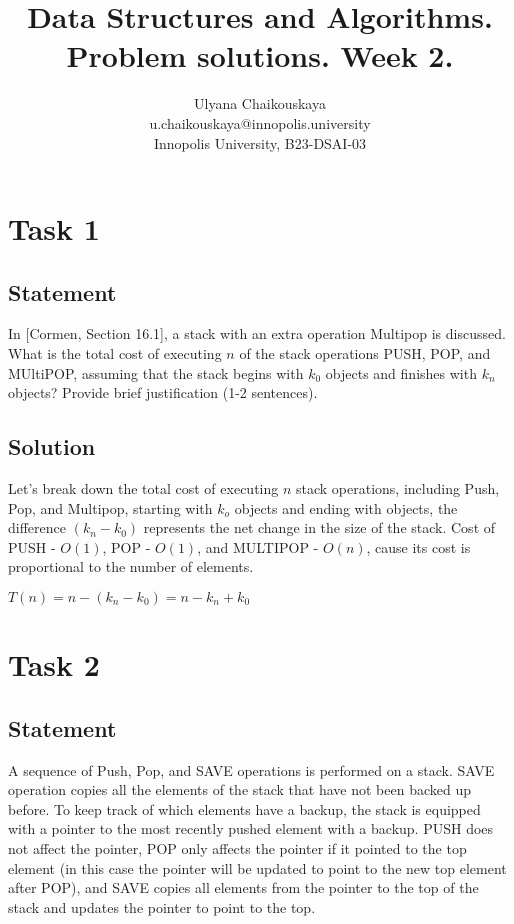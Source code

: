 \documentclass{article}
\title{Data Structures and Algorithms. \\ Problem solutions. Week 2.}
\author{Ulyana Chaikouskaya \\ u.chaikouskaya@innopolis.university \\ Innopolis University, B23-DSAI-03}
\begin{document}
\maketitle


\section{Task 1}

\subsection{Statement}

 In [Cormen, Section 16.1], a stack with an extra operation Multipop is discussed. What is the total cost of executing $n$ of the stack operations PUSH, POP, and MUltiPOP, assuming that the stack begins with $k_{0}$ objects and finishes with $k_{n}$ objects? Provide brief justification (1-2 sentences).
 
\subsection{Solution}

Let's break down the total cost of executing $n$ stack operations, including Push, Pop, and Multipop, starting with $k_o$ objects and ending with objects, the difference $( k_{n} - k_{0} )$ represents the net change in the size of the stack.
Cost of PUSH - $O(1)$, POP - $O(1)$, and MULTIPOP - $O(n)$, cause  its cost is proportional to the number of elements.

$T(n) = n - ( k_{n} - k_{0} ) =  n -  k_{n} + k_{0} $


\section{Task 2}

\subsection{Statement}

A sequence of Push, Pop, and SAVE operations is performed on a stack. SAVE operation copies all the elements of the stack that have not been backed up before. To keep track of which elements have a backup, the stack is equipped with a pointer to the most recently pushed element with a backup. PUSH does not affect the pointer, POP only affects the pointer if it pointed to the top element (in this case the pointer will be updated to point to the new top element after POP), and SAVE copies all elements from the pointer to the top of the stack and updates the pointer to point to the top.
  
\end{document}
